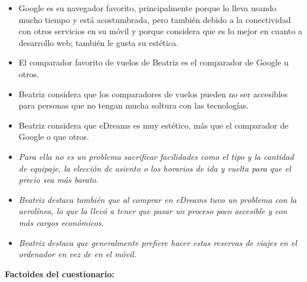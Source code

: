 \begin{itemize}
    \item Google es su navegador favorito, principalmente porque lo lleva usando mucho tiempo y está acostumbrada, pero también debido a la conectividad con otros servicios en su móvil y porque considera que es lo mejor en cuanto a desarrollo web; también le gusta su estética.
    \item El comparador favorito de vuelos de Beatriz es el comparador de Google u otros.
    \item Beatriz considera que los comparadores de vuelos pueden no ser accesibles para personas que no tengan mucha soltura con las tecnologías.
    \item Beatriz considera que eDreams es muy estético, más que el comparador de Google o que otros.
    \item \textit{Para ella no es un problema sacrificar facilidades como el tipo y la cantidad de equipaje, la elección de asiento o los horarios de ida y vuelta para que el precio sea más barato}.
    \item \textit{Beatriz destaca también que al comprar en eDreams tuvo un problema con la aerolínea, lo que la llevó a tener que pasar un proceso poco accesible y con más cargos económicos.}
    \item \textit{Beatriz destaca que generalmente prefiere hacer estas reservas de viajes en el ordenador en vez de en el móvil.}
\end{itemize}


\textbf{Factoides del cuestionario:}

